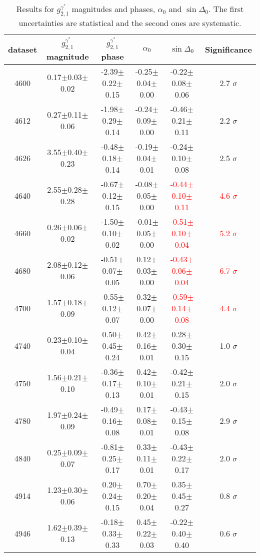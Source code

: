 \begin{table}[H]
    \centering
    \caption{Results for $g_{2,1}^{\gamma^*}$ magnitudes and phases, $\alpha_0$ and $\sin\Delta_0$. The first uncertainties are statistical and the second ones are systematic.}
    \label{tab:final-results}
    \begin{tabular}{cccccc}
    \hline\hline
dataset & $g_{2,1}^{\gamma^*}$ magnitude & $g_{2,1}^{\gamma^*}$ phase & $\alpha_0$ & $\sin\Delta_0$  & Significance \\\hline
4600 & 0.17$\pm$0.03$\pm$0.02 & -2.39$\pm$0.22$\pm$0.15 & -0.25$\pm$0.04$\pm$0.00 & -0.22$\pm$0.08$\pm$0.06 & 2.7 $\sigma$\\
4612 & 0.27$\pm$0.11$\pm$0.06 & -1.98$\pm$0.29$\pm$0.14 & -0.24$\pm$0.09$\pm$0.00 & -0.46$\pm$0.21$\pm$0.11 & 2.2 $\sigma$\\
4626 & 3.55$\pm$0.40$\pm$0.23 & -0.48$\pm$0.18$\pm$0.14 & -0.19$\pm$0.04$\pm$0.01 & -0.24$\pm$0.10$\pm$0.08 & 2.5 $\sigma$\\
4640 & 2.55$\pm$0.28$\pm$0.28 & -0.67$\pm$0.12$\pm$0.15 & -0.08$\pm$0.05$\pm$0.00 & \textcolor{red}{-0.44$\pm$0.10$\pm$0.11}  & \textcolor{red}{4.6 $\sigma$}\\
4660 & 0.26$\pm$0.06$\pm$0.02 & -1.50$\pm$0.10$\pm$0.02 & -0.01$\pm$0.05$\pm$0.00 & \textcolor{red}{-0.51$\pm$0.10$\pm$0.04} & \textcolor{red}{5.2 $\sigma$}\\
4680 & 2.08$\pm$0.12$\pm$0.06 & -0.51$\pm$0.07$\pm$0.05 & 0.12$\pm$0.03$\pm$0.00 & \textcolor{red}{-0.43$\pm$0.06$\pm$0.04}  & \textcolor{red}{6.7 $\sigma$}\\
4700 & 1.57$\pm$0.18$\pm$0.09 & -0.55$\pm$0.12$\pm$0.07 & 0.32$\pm$0.07$\pm$0.00 & \textcolor{red}{-0.59$\pm$0.14$\pm$0.08} & \textcolor{red}{4.4 $\sigma$}\\
4740 & 0.23$\pm$0.10$\pm$0.04 & 0.50$\pm$0.45$\pm$0.24  & 0.42$\pm$0.16$\pm$0.01 & 0.28$\pm$0.30$\pm$0.15 & 1.0 $\sigma$\\
4750 & 1.56$\pm$0.21$\pm$0.10 & -0.36$\pm$0.17$\pm$0.13 & 0.42$\pm$0.10$\pm$0.01 & -0.42$\pm$0.21$\pm$0.15 & 2.0 $\sigma$\\
4780 & 1.97$\pm$0.24$\pm$0.09 & -0.49$\pm$0.16$\pm$0.08 & 0.17$\pm$0.08$\pm$0.01 & -0.43$\pm$0.15$\pm$0.08 & 2.9 $\sigma$\\
4840 & 0.25$\pm$0.09$\pm$0.07 & -0.81$\pm$0.25$\pm$0.17 & 0.33$\pm$0.11$\pm$0.01 & -0.43$\pm$0.22$\pm$0.17 & 2.0 $\sigma$\\
4914 & 1.23$\pm$0.30$\pm$0.06 & 0.20$\pm$0.24$\pm$0.15  & 0.70$\pm$0.20$\pm$0.04 & 0.35$\pm$0.45$\pm$0.27 & 0.8 $\sigma$\\
4946 & 1.62$\pm$0.39$\pm$0.13 & -0.18$\pm$0.33$\pm$0.33 & 0.45$\pm$0.22$\pm$0.03 & -0.22$\pm$0.40$\pm$0.40 & 0.6 $\sigma$\\
\hline\hline
    \end{tabular}
\end{table}


